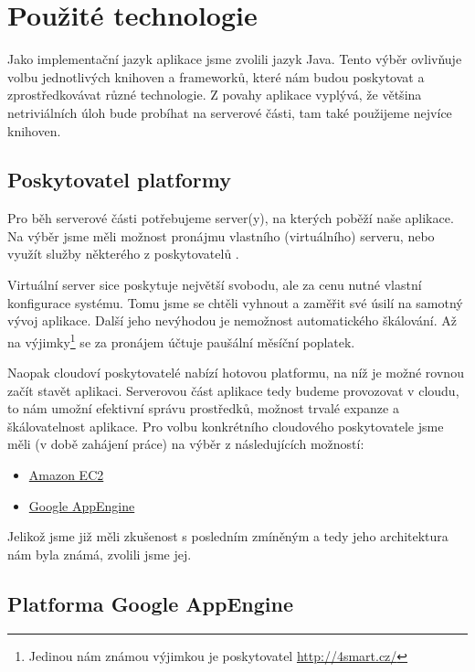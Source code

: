 \chapter{Použité technologie}

Jako implementační jazyk aplikace jsme zvolili jazyk Java.
Tento výběr ovlivňuje volbu jednotlivých knihoven a frameworků, které nám budou poskytovat a zprostředkovávat různé technologie.
Z povahy aplikace vyplývá, že většina netriviálních úloh bude probíhat na serverové části, tam také použijeme nejvíce knihoven.

\section{Poskytovatel platformy}
Pro běh serverové části potřebujeme server(y), na kterých poběží naše aplikace.
Na výběr jsme měli možnost pronájmu vlastního (virtuálního) serveru, nebo využít služby některého z poskytovatelů .

Virtuální server sice poskytuje největší svobodu, ale za cenu nutné vlastní konfigurace systému.
Tomu jsme se chtěli vyhnout a zaměřit své úsilí na samotný vývoj aplikace.
Další jeho nevýhodou je nemožnost automatického škálování.
Až na výjimky\footnote{Jedinou nám známou výjimkou je poskytovatel \url{http://4smart.cz/}} se za pronájem účtuje paušální měsíční poplatek.

Naopak cloudoví poskytovatelé nabízí hotovou platformu, na níž je možné rovnou začít stavět aplikaci.
Serverovou část aplikace tedy budeme provozovat v cloudu, to nám umožní efektivní správu prostředků, možnost trvalé expanze a škálovatelnost aplikace.
Pro volbu konkrétního cloudového poskytovatele jsme měli (v době zahájení práce) na výběr z následujících možností:
\begin{itemize}
	\item \href{http://aws.amazon.com/ec2/}{Amazon EC2}
	\item \href{http://appengine.google.com/}{Google AppEngine}
\end{itemize}

Jelikož jsme již měli zkušenost s posledním zmíněným a tedy jeho architektura nám byla známá, zvolili jsme jej.

\section{Platforma Google AppEngine}

